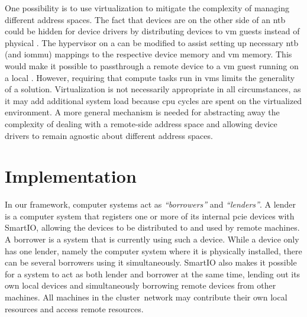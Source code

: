 One possibility is to use virtualization to mitigate the complexity of managing different address spaces.
%
The fact that devices are on the other side of an \gls{ntb} could be hidden for device drivers by distributing devices to \gls{vm} \glspl{guest} instead of physical .
%
The \gls{hypervisor} on a  can be modified to assist setting up necessary \gls{ntb} (and \gls{iommu}) mappings to the respective device memory and \gls{vm} memory.
%
This would make it possible to \gls{passthrough} a remote device to a \gls{vm} \gls{guest} running on a local .
%
However, requiring that compute tasks run in \glspl{vm} limits the generality of a solution.
%
Virtualization is not necessarily appropriate in all circumstances, as it may add additional system load because \gls{cpu} cycles are spent on  the virtualized environment.
%
A more general mechanism is needed for abstracting away the complexity of dealing with a remote-side address space and allowing device drivers to remain agnostic about different address spaces.
%


\section{Implementation}\label{sec:impl}
In our framework, computer systems act as \emph{``\glspl{borrower}''} and \emph{``\glspl{lender}''}.
%
A \gls{lender} is a computer system that registers one or more of its internal \gls{pcie} devices with SmartIO, allowing the devices to be distributed to and used by remote machines.
%
A \gls{borrower} is a system that is currently using such a device. 
%
While a device only has one \gls{lender}, namely the computer system where it is physically installed, there can be several \glspl{borrower} using it simultaneously.
%
SmartIO also makes it possible for a system to act as both \gls{lender} and \gls{borrower} at the same time, lending out its own local devices and simultaneously borrowing remote devices from other machines.
%
All machines in the cluster~network may contribute their own local resources and access remote resources.



